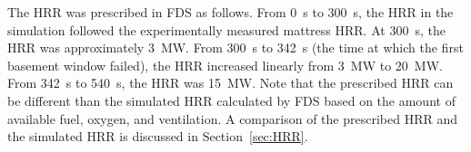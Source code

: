 \documentclass[12pt,oneside]{book}
\begin{document}
The HRR was prescribed in FDS as follows. From 0~s to 300~s, the HRR in the simulation followed the experimentally measured mattress HRR. At 300~s, the HRR was approximately 3~MW. From 300~s to 342~s (the time at which the first basement window failed), the HRR increased linearly from 3~MW to 20~MW. From 342~s to 540~s, the HRR was 15~MW. Note that the prescribed HRR can be different than the simulated HRR calculated by FDS based on the amount of available fuel, oxygen, and ventilation. A comparison of the prescribed HRR and the simulated HRR is discussed in Section~\ref{sec:HRR}.

\end{document}
